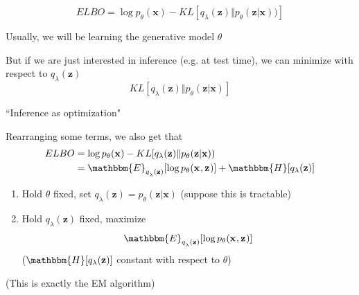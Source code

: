 \documentclass{beamer}
\let\tempone\itemize
\let\temptwo\enditemize
\renewenvironment{itemize}{\tempone\addtolength{\itemsep}{0.5\baselineskip}}{\temptwo}
\newcommand{\zvec}{\mathbf{z}}
\newcommand{\E}{\mathbbm{E}}
\newcommand{\xvec}{\mathbf{x}}
\begin{document}
\begin{frame}
  \begin{center}
   \end{center}   
   
  \[ ELBO = \log p_\theta(\xvec)- KL[ q_\lambda(\zvec) \Vert p_\theta(\zvec | \xvec)) ]  \]

\begin{itemize}
\item Usually, we will be learning the generative model $\theta$
\item But if we are just interested in inference (e.g. at test time), we can minimize with respect to $q_\lambda(\zvec)$
\[ KL[q_\lambda(\zvec) \Vert p_\theta(\zvec | \xvec)] \]
\item ``Inference as optimization"
\end{itemize}
\end{frame}


\begin{frame}
  \begin{center}
   \end{center}   
   Rearranging some terms, we also get that 
   \begin{align*}
    ELBO &= \log p_\theta(\xvec)- KL[ q_\lambda(\zvec) \Vert p_\theta(\zvec | \xvec)) \\
    &= \E_{q_\lambda^{}(\zvec)}[\log  p_\theta(\xvec^{} , \zvec^{}) ] + \mathbbm{H}[q_\lambda(\zvec)]
    \end{align*}
\begin{enumerate}
\item Hold $\theta$ fixed, set $q_\lambda(\zvec) = p_\theta (\zvec | \xvec) $ (suppose this is tractable)
\item Hold $q_\lambda(\zvec)$ fixed, maximize 
\[ \E_{q_\lambda^{}(\zvec)}[\log  p_\theta(\xvec^{} , \zvec^{}) ]  \]
($\mathbbm{H}[q_\lambda(\zvec)]$ constant with respect to $\theta$)
\end{enumerate}
(This is exactly the EM algorithm)
\end{frame}

\end{document}
